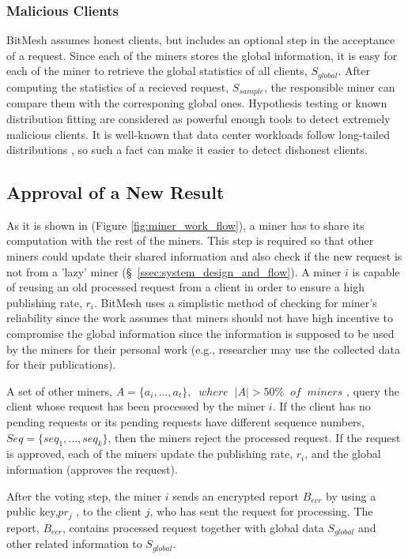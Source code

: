 \documentclass[11px]{article}
\newcommand{\projTitle}{BitMesh\xspace}
\begin{document}
\subsubsection{Malicious Clients}
\label{sssec:malicious_client}
\projTitle assumes honest clients, but includes an optional step in the acceptance of a request. Since each of the miners stores the global information, it is easy for each of the miner to retrieve the global statistics of all clients, $S_{global}$. After computing the statistics of a recieved request, $S_{sample}$, the responsible miner can compare them with the corresponing global ones. Hypothesis testing or known distribution fitting \cite{walpole_statistics} are considered as powerful enough tools to detect extremely malicious clients. It is well-known that data center workloads follow long-tailed distributions \cite{diurnal_pattern_data_center_2, dctcp_ref, pFabric_ref}, so such a fact can make it easier to detect dishonest clients.

\subsection{Approval of a New Result}
As it is shown in (Figure \ref{fig:miner_work_flow}), a miner has to share its computation with the rest of the miners.  This step is required so that other miners could update their shared information and also check if the new request is not from a 'lazy' miner (\S\ \ref{ssec:system_design_and_flow}). A miner $i$ is capable of  reusing an old processed request from a client in order to ensure a high publishing rate, $r_i$. \projTitle uses a simplistic method of checking for miner's reliability since the work assumes that miners should not have high incentive to compromise the global information since the information is supposed to be used by the miners for their personal work (e.g., researcher may use the collected data for their publications).

\noindent \newline A set of other miners, $A= \{a_i, ..., a_t\}, \; \; where \; \; |A| > 50\% \; \; of \; \; miners$ , query the client whose request has been processed by the miner $i$. If the client has no pending requests or its pending requests have different sequence numbers, $Seq = \{seq_1, ..., seq_k\}$, then the miners reject the processed request. If the request is approved, each of the miners update the publishing rate, $r_i$, and the global information (approves the request).

\noindent \newline After the voting step, the miner $i$ sends an encrypted report $B_{ecr}$ by using a public key,$pr_j$ , to the client $j$, who has sent the request for processing. The report, $B_{ecr}$, contains processed request together with global data $S_{global}$  and other related information to $S_{global}$.
\end{document}
